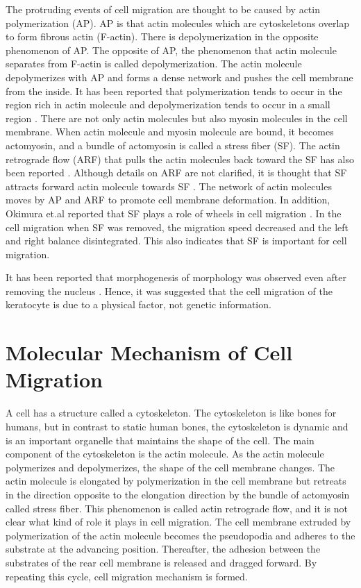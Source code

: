 \documentclass[a4paper,12pt, oneside]{book}
\begin{document}
The protruding events of cell migration are thought to be caused by actin polymerization (AP)\cite{svitkina1997analysis}.
AP is that actin molecules which are cytoskeletons overlap to form fibrous actin (F-actin).
There is depolymerization in the opposite phenomenon of AP.
The opposite of AP, the phenomenon that actin molecule separates from F-actin is called depolymerization.
The actin molecule depolymerizes with AP and forms a dense network and pushes the cell membrane from the inside.
It has been reported that polymerization  tends to occur in the region rich in actin molecule and depolymerization tends to occur in a small region \cite{yumura1998spatiotemporal}.
There are not only actin molecules but also myosin molecules in the cell membrane.
When actin molecule and myosin molecule are bound, it becomes actomyosin, and a bundle of actomyosin is called a stress fiber (SF).
The actin retrograde flow (ARF) that pulls the actin molecules back toward the SF has also been reported \cite{swaminathan2017actin}.
Although details on ARF are not clarified, it is thought that SF attracts forward actin molecule towards SF \cite{nakata2016role}.
The network of actin molecules moves by AP and ARF to promote cell membrane deformation.
In addition, Okimura et.al reported that SF plays a role of wheels in cell migration \cite{okimura2018rotation}.
In the cell migration when SF was removed, the migration speed decreased and the left and right balance disintegrated.
This also indicates that SF is important for cell migration.

It has been reported that morphogenesis of morphology was observed even after removing the nucleus \cite{asano2004keratocyte}.
Hence, it was suggested that the cell migration of the keratocyte is due to a physical factor, not genetic information.


\section{Molecular Mechanism of Cell Migration}
A cell has a structure called a cytoskeleton. The cytoskeleton is like bones for humans, but in contrast to static human bones, the cytoskeleton is dynamic and is an important organelle that maintains the shape of the cell. The main component of the cytoskeleton is the actin molecule. As the actin molecule polymerizes and depolymerizes, the shape of the cell membrane changes. The actin molecule is elongated by polymerization in the cell membrane but retreats in the direction opposite to the elongation direction by the bundle of actomyosin called stress fiber. This phenomenon is called actin retrograde flow, and it is not clear what kind of role it plays in cell migration. The cell membrane extruded by polymerization of the actin molecule becomes the pseudopodia and adheres to the substrate at the advancing position. Thereafter, the adhesion between the substrates of the rear cell membrane is released and dragged forward. By repeating this cycle, cell migration mechanism is formed.
\end{document}
